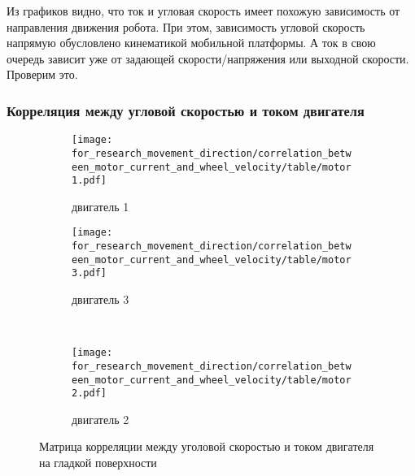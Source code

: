 Из графиков видно, что ток и угловая скорость имеет похожую зависимость от направления движения робота. При этом, зависимость угловой скорость напрямую обусловлено кинематикой мобильной платформы. А ток в свою очередь зависит уже от задающей скорости/напряжения или выходной скорости. Проверим это.

\subsubsection{Корреляция между угловой скоростью и током двигателя}

\begin{figure}[H]
    \centering
    \begin{subfigure}{0.49\textwidth}
        \centering
        \texttt{[image: for\_research\_movement\_direction/correlation\_between\_motor\_current\_and\_wheel\_velocity/table/motor1.pdf]}
        \caption{двигатель 1}
    \end{subfigure}
    \hspace{0.005\textwidth}
    \begin{subfigure}{0.49\textwidth}
        \centering
        \texttt{[image: for\_research\_movement\_direction/correlation\_between\_motor\_current\_and\_wheel\_velocity/table/motor3.pdf]}
        \caption{двигатель 3}
    \end{subfigure} \\
    \vspace{4pt}
    \centering
    \begin{subfigure}{0.49\textwidth}
        \centering
        \texttt{[image: for\_research\_movement\_direction/correlation\_between\_motor\_current\_and\_wheel\_velocity/table/motor2.pdf]}
        \caption{двигатель 2}
    \end{subfigure}
    \caption{Матрица корреляции между уголовой скоростью и током двигателя на гладкой поверхности}
\end{figure}

